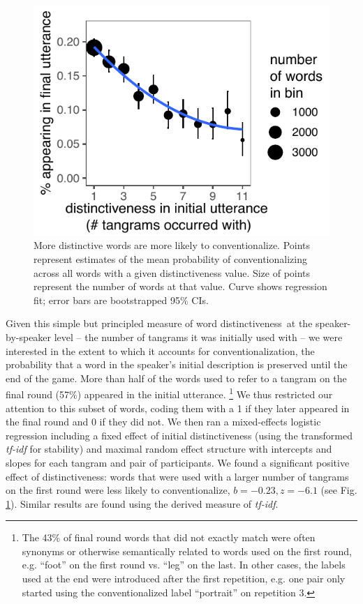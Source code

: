 \documentclass[alpha-refs]{wiley-article}
\begin{document}
\begin{figure}[t!]
\centering
\includegraphics[scale=.9]{distinctiveness.pdf}
\caption{More distinctive words are more likely to conventionalize. Points represent estimates of the mean probability of conventionalizing across all words with a given distinctiveness value. Size of points represent the number of words at that value. Curve shows regression fit; error bars are bootstrapped 95\% CIs.}
\label{fig:distinct}
\end{figure}

Given this simple but principled measure of word distinctiveness at the speaker-by-speaker level -- the number of tangrams it was initially used with -- we were interested in the extent to which it accounts for conventionalization, the probability that a word in the speaker's initial description is preserved until the end of the game. 
More than half of the words used to refer to a tangram on the final round (57\%) appeared in the initial utterance. \footnote{The 43\% of final round words that did not exactly match were often synonyms or otherwise semantically related to words used on the first round, e.g. ``foot'' on the first round vs. ``leg'' on the last. In other cases, the labels used at the end were introduced after the first repetition, e.g. one pair only started using the conventionalized label ``portrait'' on repetition 3.}
We thus restricted our attention to this subset of words, coding them with a 1 if they later appeared in the final round and 0 if they did not.
We then ran a mixed-effects logistic regression including a fixed effect of initial distinctiveness (using the transformed \emph{tf-idf} for stability) and maximal random effect structure with intercepts and slopes for each tangram and pair of participants.
We found a significant positive effect of distinctiveness: words that were used with a larger number of tangrams on the first round were less likely to conventionalize, $b = -0.23, z = -6.1$ (see Fig. \ref{fig:distinct}). 
Similar results are found using the derived measure of \emph{tf-idf}.
\end{document}
